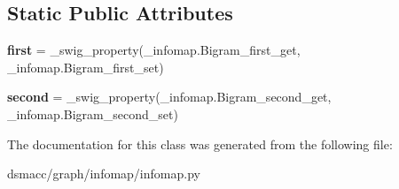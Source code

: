 \subsection*{Static Public Attributes}
\begin{DoxyCompactItemize}
\item 
\mbox{\label{classdsmacc_1_1graph_1_1infomap_1_1infomap_1_1Bigram_a882b566d4a9bb33627a8ad8dd01b8b01}} 
{\bfseries first} = \+\_\+swig\+\_\+property(\+\_\+infomap.\+Bigram\+\_\+first\+\_\+get, \+\_\+infomap.\+Bigram\+\_\+first\+\_\+set)
\item 
\mbox{\label{classdsmacc_1_1graph_1_1infomap_1_1infomap_1_1Bigram_a97470e4a9e6669eff38ef8d175fa2f83}} 
{\bfseries second} = \+\_\+swig\+\_\+property(\+\_\+infomap.\+Bigram\+\_\+second\+\_\+get, \+\_\+infomap.\+Bigram\+\_\+second\+\_\+set)
\end{DoxyCompactItemize}


The documentation for this class was generated from the following file\+:\begin{DoxyCompactItemize}
\item 
dsmacc/graph/infomap/infomap.\+py\end{DoxyCompactItemize}
